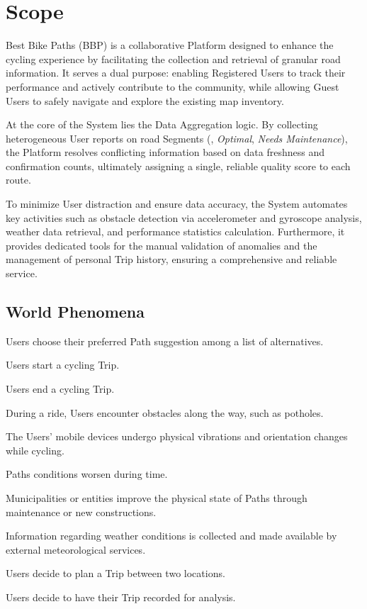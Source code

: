 \section{Scope}

Best Bike Paths (BBP) is a collaborative Platform designed to enhance the cycling experience by facilitating the collection and retrieval of granular road information. It serves a dual purpose: enabling Registered Users to track their performance and actively contribute to the community, while allowing Guest Users to safely navigate and explore the existing map inventory.

At the core of the System lies the Data Aggregation logic. By collecting heterogeneous User reports on road Segments (\eg, \emph{Optimal}, \emph{Needs Maintenance}), the Platform resolves conflicting information based on data freshness and confirmation counts, ultimately assigning a single, reliable quality score to each route.

To minimize User distraction and ensure data accuracy, the System automates key activities such as obstacle detection via accelerometer and gyroscope analysis, weather data retrieval, and performance statistics calculation. Furthermore, it provides dedicated tools for the manual validation of anomalies and the management of personal Trip history, ensuring a comprehensive and reliable service.
\subsection{World Phenomena}
\begin{wplist}
    \item Users choose their preferred Path suggestion among a list of alternatives.
    \item Users start a cycling Trip.
    \item Users end a cycling Trip.
    \item During a ride, Users encounter obstacles along the way, such as potholes.
    \item The Users' mobile devices undergo physical vibrations and orientation changes while cycling.
    \item Paths conditions worsen during time.
    \item Municipalities or entities improve the physical state of Paths through maintenance or new constructions.
    \item Information regarding weather conditions is collected and made available by external meteorological services.
    \item Users decide to plan a Trip between two locations.
    \item Users decide to have their Trip recorded for analysis.
\end{wplist}

